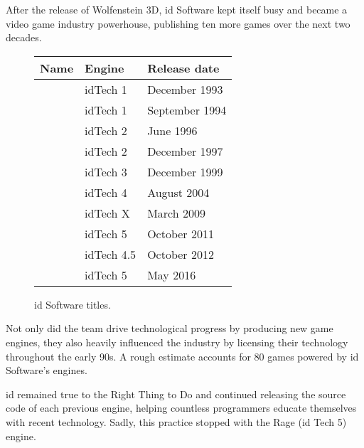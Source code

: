 After the release of Wolfenstein 3D, id Software kept itself busy and became a video game industry powerhouse, publishing ten more games over the next two decades. 
 \begin{figure}[H]
\centering  
\begin{tabularx}{\textwidth}{ X  Y Y }
  \toprule
  \textbf{Name} & \textbf{Engine}  & \textbf{Release date} \\
  \toprule {}\protect\footnotemark & idTech 1 & December 1993 \\ 
            & idTech 1 & September 1994 \\ 
            & idTech 2 &June 1996 \\ 
            & idTech 2 & December 1997 \\ 
            &  idTech 3 & December 1999 \\ 
            &  idTech 4 & August 2004 \\ 
            &  idTech X & March 2009 \\ 
            &  idTech 5 & October 2011 \\ 
            &  idTech 4.5\protect\footnotemark & October 2012 \\ 
            &  idTech 5 & May 2016 \\ 
  \toprule
\end{tabularx}
\caption{id Software titles.}\label{fig:vga_history}
\end{figure}
\par
{}
Not only did the team drive technological progress by producing new game engines, they also heavily influenced the industry by licensing their technology throughout the early 90s. A rough estimate accounts for 80 games powered by id Software's engines.\\
\par
id remained true to the Right Thing to Do and continued releasing the source code of each previous engine, helping countless programmers educate themselves with recent technology. Sadly, this practice stopped with the Rage (id Tech 5) engine.
\par
